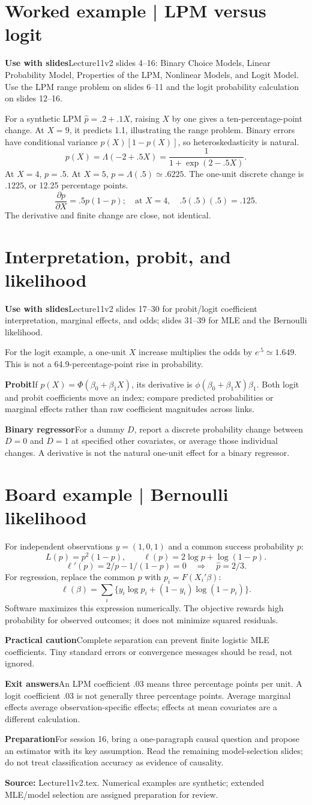 \documentclass[11pt,a4paper]{article}
\newcommand{\heading}[1]{\section*{\color{accent}#1}}
\newcommand{\cue}[2]{\par\noindent\textbf{#1}\quad #2\par}
\begin{document}
\heading{Worked example | LPM versus logit}
\cue{Use with slides}{Lecture11v2 slides 4--16: Binary Choice Models, Linear Probability Model, Properties of the LPM, Nonlinear Models, and Logit Model. Use the LPM range problem on slides 6--11 and the logit probability calculation on slides 12--16.}
For a synthetic LPM $\hat p=.2+.1X$, raising $X$ by one gives a ten-percentage-point change. At $X=9$, it predicts 1.1, illustrating the range problem. Binary errors have conditional variance $p(X)[1-p(X)]$, so heteroskedasticity is natural.
\[
p(X)=\Lambda(-2+.5X)=\frac{1}{1+\exp(2-.5X)}.
\]
At $X=4$, $p=.5$. At $X=5$, $p=\Lambda(.5)\simeq.6225$. The one-unit discrete change is $.1225$, or 12.25 percentage points.
\[
\frac{\partial p}{\partial X}=.5p(1-p);
\quad \text{at }X=4,\quad .5(.5)(.5)=.125.
\]
The derivative and finite change are close, not identical.

\newpage
\heading{Interpretation, probit, and likelihood}
\cue{Use with slides}{Lecture11v2 slides 17--30 for probit/logit coefficient interpretation, marginal effects, and odds; slides 31--39 for MLE and the Bernoulli likelihood.}
For the logit example, a one-unit $X$ increase multiplies the odds by $e^{.5}\simeq1.649$. This is not a 64.9-percentage-point rise in probability.
\cue{Probit}{If $p(X)=\Phi(\beta_0+\beta_1X)$, its derivative is $\phi(\beta_0+\beta_1X)\beta_1$. Both logit and probit coefficients move an index; compare predicted probabilities or marginal effects rather than raw coefficient magnitudes across links.}
\cue{Binary regressor}{For a dummy $D$, report a discrete probability change between $D=0$ and $D=1$ at specified other covariates, or average those individual changes. A derivative is not the natural one-unit effect for a binary regressor.}
\heading{Board example | Bernoulli likelihood}
For independent observations $y=(1,0,1)$ and a common success probability $p$:
\[
L(p)=p^2(1-p),\qquad \ell(p)=2\log p+\log(1-p).
\]
\[
\ell'(p)=2/p-1/(1-p)=0\quad\Rightarrow\quad\hat p=2/3.
\]
For regression, replace the common $p$ with $p_i=F(X_i'\beta)$:
\[
\ell(\beta)=\sum_i\{y_i\log p_i+(1-y_i)\log(1-p_i)\}.
\]
Software maximizes this expression numerically. The objective rewards high probability for observed outcomes; it does not minimize squared residuals.
\cue{Practical caution}{Complete separation can prevent finite logistic MLE coefficients. Tiny standard errors or convergence messages should be read, not ignored.}
\cue{Exit answers}{An LPM coefficient $.03$ means three percentage points per unit. A logit coefficient $.03$ is not generally three percentage points. Average marginal effects average observation-specific effects; effects at mean covariates are a different calculation.}
\cue{Preparation}{For session 16, bring a one-paragraph causal question and propose an estimator with its key assumption. Read the remaining model-selection slides; do not treat classification accuracy as evidence of causality.}
\textbf{Source:} Lecture11v2.tex. Numerical examples are synthetic; extended MLE/model selection are assigned preparation for review.
\end{document}
